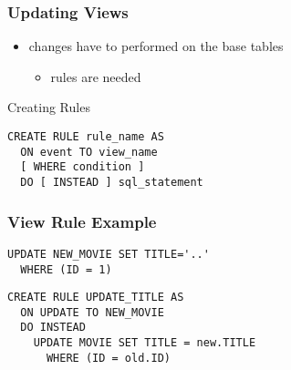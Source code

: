 \documentclass[dvipsnames]{beamer}
\theoremstyle{plain}
\begin{document}
\begin{frame}[fragile]
  \frametitle{Updating Views}

  \begin{itemize}
    \item changes have to performed on the base tables
    \begin{itemize}
      \item rules are needed
    \end{itemize}
  \end{itemize}

  \pause
  \begin{block}{Creating Rules}
    \begin{lstlisting}[language=ExtendedSQL]
CREATE RULE rule_name AS
  ON event TO view_name
  [ WHERE condition ]
  DO [ INSTEAD ] sql_statement
    \end{lstlisting}
  \end{block}
\end{frame}

\begin{frame}[fragile]
  \frametitle{View Rule Example}

  \begin{example}
    \begin{lstlisting}[language=ExtendedSQL]
UPDATE NEW_MOVIE SET TITLE='..'
  WHERE (ID = 1)
    \end{lstlisting}

    \pause
    \begin{lstlisting}[language=ExtendedSQL]
CREATE RULE UPDATE_TITLE AS
  ON UPDATE TO NEW_MOVIE
  DO INSTEAD
    UPDATE MOVIE SET TITLE = new.TITLE
      WHERE (ID = old.ID)
    \end{lstlisting}
  \end{example}
\end{frame}

%
%
%
%
\end{document}
